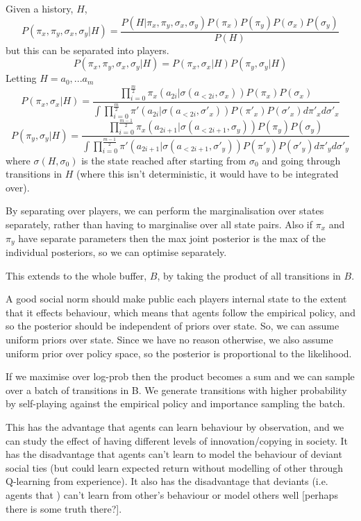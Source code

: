 \documentclass[a4paper]{report}
\begin{document}
Given a history, $H$,
\[
P(\pi_x,\pi_y,\sigma_x,\sigma_y|H) = \frac{P(H|\pi_x,\pi_y,\sigma_x, \sigma_y)P(\pi_x)P(\pi_y)P(\sigma_x)P(\sigma_y)}{P(H)}
\]
but this can be separated into players.
\[
P(\pi_x,\pi_y,\sigma_x,\sigma_y|H) = P(\pi_x,\sigma_x|H)P(\pi_y,\sigma_y|H)
\]
Letting $H=a_0,...a_m$
\[
P(\pi_x,\sigma_x|H)= 
\frac{\prod_{i=0}^{\frac{m}{2}} \pi_x(a_{2i}| \sigma(a_{<2i},\sigma_x))P(\pi_x)P(\sigma_x)}
{\int\prod_{i=0}^{\frac{m}{2}} \pi'(a_{2i}| \sigma(a_{<2i},\sigma'_x))P(\pi'_x)P(\sigma'_x) d\pi'_x d\sigma'_x}
\]
\[
P(\pi_y,\sigma_y|H) = \frac{\prod_{i=0}^{\frac{m-1}{2}} \pi_x(a_{2i+1}| \sigma(a_{<2i+1},\sigma_y))P(\pi_y)P(\sigma_y)}
{\int\prod_{i=0}^{\frac{m-1}{2}} \pi'(a_{2i+1}| \sigma(a_{<2i+1},\sigma'_y))P(\pi'_y)P(\sigma'_y) d\pi'_y d\sigma'_y}
\]
where $\sigma(H,\sigma_0)$ is the state reached after starting from $\sigma_0$ and going through transitions in $H$ (where this isn't deterministic, it would have to be integrated over).
 
By separating over players, we can perform the marginalisation over states separately, rather than having to marginalise over all state pairs. Also if $\pi_x$ and $\pi_y$ have separate parameters then the max joint posterior is the max of the individual posteriors, so we can optimise separately.

This extends to the whole buffer, $B$, by taking the product of all transitions in $B$.

A good social norm should make public each players internal state to the extent that it effects behaviour, which means that agents follow the empirical policy, and so the posterior should be independent of priors over state. So, we can assume uniform priors over state. Since we have no reason otherwise, we also assume uniform prior over policy space, so the posterior is proportional to the likelihood. 

If we maximise over log-prob then the product becomes a sum and we can sample over a batch of transitions in B. We generate transitions with higher probability by self-playing against the empirical policy and importance sampling the batch.
 
This has the advantage that agents can learn behaviour by observation, and we can study the effect of having different levels of innovation/copying in society. It has the disadvantage that agents can't learn to model the behaviour of deviant social ties (but could learn expected return without modelling of other through Q-learning from experience). It also has the disadvantage that deviants (i.e. agents that ) can't learn from other's behaviour or model others well [perhaps there is some truth there?].
\end{document}
